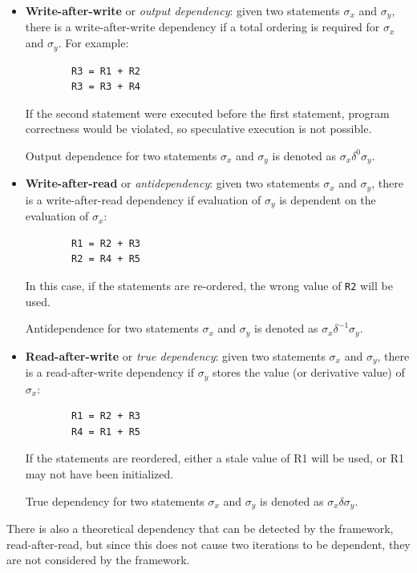 	\begin{itemize}\label{fig:dep-kinds}
		\item \textbf{Write-after-write} or \textit{output dependency}: given two statements $\sigma_x$ and $\sigma_y$, there is a write-after-write dependency if a total ordering is required for $\sigma_x$ and $\sigma_y$. For example:
		
		\begin{verbatim}
		R3 = R1 + R2
		R3 = R3 + R4
		\end{verbatim}
		
		If the second statement were executed before the first statement, program correctness would be violated, so speculative execution is not possible.
		
		Output dependence for two statements $\sigma_x$ and $\sigma_y$ is denoted as $\sigma_x \delta^0 \sigma_y$.
		
		\item \textbf{Write-after-read} or \textit{antidependency}: given two statements $\sigma_x$ and $\sigma_y$, there is a write-after-read dependency if evaluation of $\sigma_y$ is dependent on the evaluation of $\sigma_x$:
		
		\begin{verbatim}
		R1 = R2 + R3
		R2 = R4 + R5
		\end{verbatim}
		
		In this case, if the statements are re-ordered, the wrong value of \texttt{R2} will be used.
		
		Antidependence for two statements $\sigma_x$ and $\sigma_y$ is denoted as $\sigma_x \delta^{-1} \sigma_y$.
		
		\item \textbf{Read-after-write} or \textit{true dependency}: given two statements $\sigma_x$ and $\sigma_y$, there is a read-after-write dependency if $\sigma_y$ stores the value (or derivative value) of $\sigma_x$:
		
		\begin{verbatim}
		R1 = R2 + R3
		R4 = R1 + R5
		\end{verbatim}
		
		If the statements are reordered, either a stale value of R1 will be used, or R1 may not have been initialized.
		
		True dependency for two statements $\sigma_x$ and $\sigma_y$ is denoted as $\sigma_x \delta \sigma_y$.
	\end{itemize}
	
	There is also a theoretical dependency that can be detected by the framework, read-after-read, but since this does not cause two iterations to be dependent, they are not considered by the framework.
	
